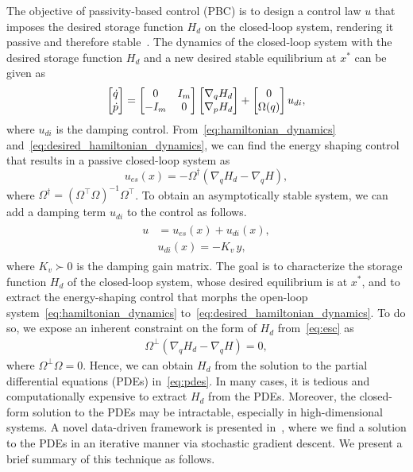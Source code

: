 The objective of passivity-based control (PBC) is to design a control law $u$
that imposes the desired storage function $H_d$ on the closed-loop system,
rendering it passive and therefore stable~\cite{van2000l2}.
%
The dynamics of the closed-loop system with the desired storage function $H_d$
and a new desired stable equilibrium at $x^*$ can be given as
\begin{align}
  \begin{split}  
    \begin{bmatrix}\dot{q} \\ \dot{p}\end{bmatrix} &= \begin{bmatrix}0 & I_m \\ -I_m & 0\end{bmatrix}\begin{bmatrix}\nabla_qH_d \\ \nabla_pH_d\end{bmatrix} + \begin{bmatrix}0 \\ \Omega(q)\end{bmatrix} u_{di}, \\
  \end{split}
  \label{eq:desired_hamiltonian_dynamics}
\end{align}
\noindent where $u_{di}$ is the damping control.
%
From~\eqref{eq:hamiltonian_dynamics}
and~\eqref{eq:desired_hamiltonian_dynamics}, we can find the energy shaping
control that results in a passive closed-loop system as
%
\begin{equation}
  u_{es}(x) =  -\Omega^{\dagger} \left( \nabla_q H_d - \nabla_q H \right),
  \label{eq:esc}
\end{equation}
\noindent where $\Omega^\dagger = \left( \Omega^\top \Omega  \right)^{-1}
\Omega^\top$. To obtain an asymptotically stable system, we can add a
damping term $u_{di}$ to the control as follows.
\begin{align}
  \begin{split} 
    u &= u_{es}(x) + u_{di}(x), \\
    &u_{di}(x) = - K_{v} \, y,
  \end{split}
  \label{eq:damping_and_es_control}
\end{align}
\noindent where $K_v \succ 0$ is the damping gain matrix.
%
The goal is to characterize the storage function $H_d$ of the closed-loop
system, whose desired equilibrium is at $x^*$, and to extract the energy-shaping
control that morphs the open-loop system~\eqref{eq:hamiltonian_dynamics}
to~\eqref{eq:desired_hamiltonian_dynamics}.
%
To do so, we expose an inherent constraint on the form of $H_d$ from~\eqref{eq:esc} as
\begin{align}
  \Omega^\bot \left( \nabla_q H_d - \nabla_q H \right) = 0,
    \label{eq:pdes}
\end{align}
where $\Omega^\perp \Omega = 0$. 
%
Hence, we can obtain $H_d$ from the solution to the partial differential
equations (PDEs) in~\eqref{eq:pdes}.
%
In many cases, it is tedious and computationally expensive to extract $H_d$ from
the PDEs. Moreover, the closed-form solution to the PDEs may be intractable,
especially in high-dimensional systems.
%
A novel data-driven framework is presented in~\cite{ashenafi2022robust,
sirichotiyakul2022data, acc}, where we find a solution to the PDEs in an
iterative manner via stochastic gradient descent.
%
We present a brief summary of this technique as follows.

